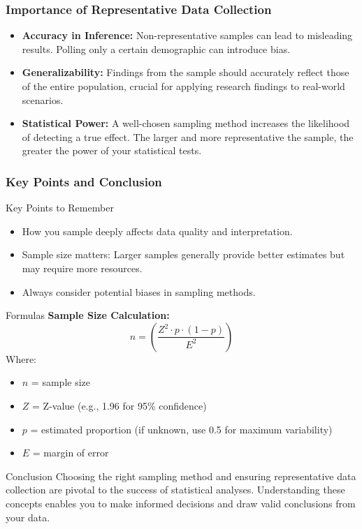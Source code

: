 \documentclass{beamer}
\begin{document}
\begin{frame}[fragile]
    \frametitle{Importance of Representative Data Collection}
    \begin{itemize}
        \item \textbf{Accuracy in Inference:} Non-representative samples can lead to misleading results. Polling only a certain demographic can introduce bias.
        
        \item \textbf{Generalizability:} Findings from the sample should accurately reflect those of the entire population, crucial for applying research findings to real-world scenarios.
        
        \item \textbf{Statistical Power:} A well-chosen sampling method increases the likelihood of detecting a true effect. The larger and more representative the sample, the greater the power of your statistical tests.
    \end{itemize}
\end{frame}

\begin{frame}[fragile]
    \frametitle{Key Points and Conclusion}
    \begin{block}{Key Points to Remember}
        \begin{itemize}
            \item How you sample deeply affects data quality and interpretation.
            \item Sample size matters: Larger samples generally provide better estimates but may require more resources.
            \item Always consider potential biases in sampling methods.
        \end{itemize}
    \end{block}
    
    \begin{block}{Formulas}
        \textbf{Sample Size Calculation:} 
        \begin{equation}
        n = \left(\frac{Z^2 \cdot p \cdot (1-p)}{E^2}\right)
        \end{equation}
        Where:
        \begin{itemize}
            \item $n$ = sample size
            \item $Z$ = Z-value (e.g., 1.96 for 95\% confidence)
            \item $p$ = estimated proportion (if unknown, use 0.5 for maximum variability)
            \item $E$ = margin of error
        \end{itemize}
    \end{block}
    
    \begin{block}{Conclusion}
        Choosing the right sampling method and ensuring representative data collection are pivotal to the success of statistical analyses. Understanding these concepts enables you to make informed decisions and draw valid conclusions from your data.
    \end{block}
\end{frame}
\end{document}
